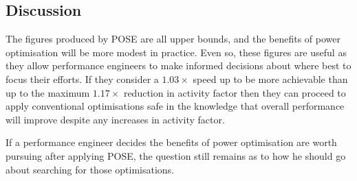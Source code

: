 \subsection{Discussion}
The figures produced by POSE are all upper bounds, and the benefits of power optimisation will be more modest in practice. Even so, these figures are useful as they allow performance engineers to make informed decisions about where best to focus their efforts. If they consider a $1.03 \times$ speed up to be more achievable than up to the maximum $1.17\times$ reduction in activity factor then they can proceed to apply conventional optimisations safe in the knowledge that overall performance will improve despite any increases in activity factor.

If a performance engineer decides the benefits of power optimisation are worth pursuing after applying POSE, the question still remains as to how he should go about searching for those optimisations.

